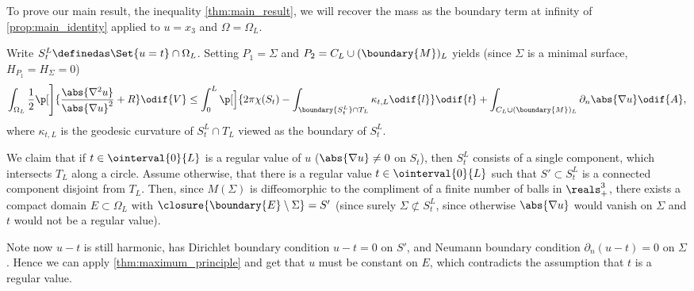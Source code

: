 \documentclass[titlepage,numbers=noenddot,headinclude,oneside,%
footinclude=true,cleardoublepage=empty,%
BCOR=5mm,paper=a4,fontsize=11pt,%
english,%
]{scrartcl}
\begin{document}
\newcommand{\nonzeroboundary}{\partial_{\neq 0}M^L}\newcommand{\maxu}{\bar{u}}
\newcommand{\minu}{\underline{u}}
To prove our main result, the inequality \cref{thm:main_result}, we will recover the mass as the boundary term at infinity of \cref{prop:main_identity} applied to \( u=x_3 \) and \( \Omega=\Omega_L \).


Write \( S_t^L\definedas \Set{u=t}\cap \Omega_L \). Setting \( P_1=\Sigma\) and \( P_2=C_L\cup (\boundary{M})_L \) yields (since \( \Sigma \) is a minimal surface, \ie \( H_{P_1}=H_\Sigma=0 \))
\begin{equation}
    \int_{\Omega_L} \frac{1}{2}\p[\Bigg]{\frac{\abs{\nabla^2 u}}{\abs{\nabla u}^2}+R }\odif{V} \leq\int_{0}^{L}\p[\Big]{2\pi \chi(S_t)-\int _{\boundary{S_t^L} \cap T_L}\kappa_{t,L}\odif{l}}\odif{t}+ \int_{C_L\cup (\boundary{M})_L}\partial_{n} \abs{\nabla u}\odif{A},\label{eq:just_insert_cylinder_into_main_identity}
\end{equation}
where \( \kappa_{t,L} \) is the geodesic curvature of \( S_{t}^L \cap T_L\) viewed as the boundary of \( S_t^L \).

We claim that if \( t\in \ointerval{0}{L} \) is a regular value of \( u \) (\ie \( \abs{\nabla u}\neq 0 \) on \( S_t \)), then \( S_t^L \) consists of a single component, which intersects \( T_L \) along a circle. Assume otherwise, \ie that there is a regular value \( t\in \ointerval{0}{L} \) such that \( S'\subset S_t^L \) is a connected component disjoint from \( T_L \). Then, since \( M(\Sigma) \) is diffeomorphic to the compliment of a finite number of balls in \( \reals^3_+ \), there exists a compact domain \( E\subset \Omega_L \) with \( \closure{\boundary{E}\setminus \Sigma}=S' \) (since surely \( \Sigma\not\subset S_t^L \), since otherwise \( \abs{\nabla u} \) would vanish on \( \Sigma \) and \( t \) would not be a regular value).

Note now \( u-t \) is still harmonic, has Dirichlet boundary condition \( u-t=0 \) on \( S' \), and Neumann boundary condition \( \partial_n (u-t)=0 \) on \( \Sigma \). Hence we can apply \cref{thm:maximum_principle} and get that \( u \) must be constant on \( E \), which contradicts the assumption that \( t \) is a regular value.
\end{document}

